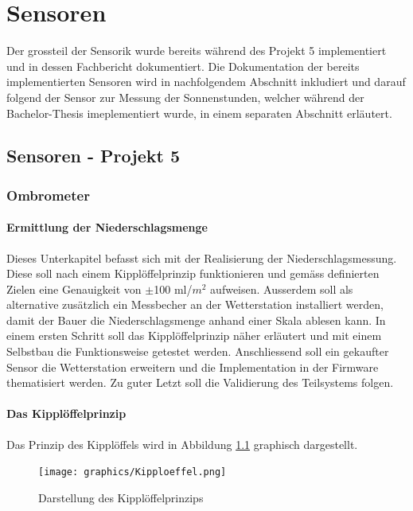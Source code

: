 \chapter{Sensoren}
\label{chap:Sensoren}
Der grossteil der Sensorik wurde bereits während des Projekt 5 implementiert und in dessen Fachbericht dokumentiert. Die Dokumentation der bereits implementierten Sensoren wird in nachfolgendem Abschnitt inkludiert und darauf folgend der Sensor zur Messung der Sonnenstunden, welcher während der Bachelor-Thesis imeplementiert wurde, in einem separaten Abschnitt erläutert.\\

\section{Sensoren - Projekt 5}
\subsection{Ombrometer}

\subsubsection*{Ermittlung der Niederschlagsmenge}
Dieses Unterkapitel befasst sich mit der Realisierung der Niederschlagsmessung. Diese soll nach einem Kipplöffelprinzip funktionieren und gemäss definierten Zielen eine Genauigkeit von $\pm$100 ml/$m^2$ aufweisen. Ausserdem soll als alternative zusätzlich ein Messbecher an der Wetterstation installiert werden, damit der Bauer die Niederschlagsmenge anhand einer Skala ablesen kann. In einem ersten Schritt soll das Kipplöffelprinzip näher erläutert und mit einem Selbstbau die Funktionsweise getestet werden. Anschliessend soll ein gekaufter Sensor die Wetterstation erweitern und die Implementation in der Firmware thematisiert werden. Zu guter Letzt soll die Validierung des Teilsystems folgen.
\subsubsection*{Das Kipplöffelprinzip}
Das Prinzip des Kipplöffels wird in Abbildung \ref{fig:Kipp} graphisch dargestellt.

\begin{figure}[h]
\centering
\texttt{[image: graphics/Kipploeffel.png]}
\caption{Darstellung des Kipplöffelprinzips}
\label{fig:Kipp}
\end{figure}


